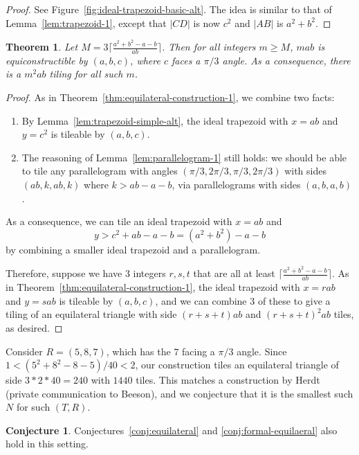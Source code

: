 \documentclass{amsart}
\theoremstyle{plain}
\newtheorem{thm}{Theorem}
\theoremstyle{definition}
\newtheorem{conj}{Conjecture}
\begin{document}
\begin{proof}
    See Figure~\ref{fig:ideal-trapezoid-basic-alt}. The idea is similar to that of Lemma~\ref{lem:trapezoid-1}, except that $|CD|$ is now $c^2$ and $|AB|$ is $a^2 + b^2$.
\end{proof}

\begin{thm}
    \label{thm:equilateral-construction-2} Let $M = 3\lceil \frac{a^2+b^2 - a - b}{ab} \rceil$. Then for all integers $m \geq M$, $mab$ is equiconstructible by $(a,b,c)$, where $c$ faces a $\pi/3$ angle. As a consequence, there is a $m^2 ab$ tiling for all such $m$.
\end{thm}
\begin{proof}
As in  Theorem~\ref{thm:equilateral-construction-1}, we combine two facts:
\begin{enumerate}
    \item By Lemma~\ref{lem:trapezoid-simple-alt}, the ideal trapezoid with $x=ab$ and $y=c^2$ is tileable by $(a,b,c).$ 
    \item The reasoning of Lemma~\ref{lem:parallelogram-1} still holds: we should be able to tile any parallelogram with angles $(\pi/3, 2\pi/3, \pi/3, 2\pi/3)$ with sides $(ab,k,ab,k)$ where $k > ab-a-b$, via parallelograms with sides $(a,b,a,b)$.
\end{enumerate} 
As a consequence, we can  tile an ideal trapezoid with $x=ab$ and 
$$y > c^2 + ab-a-b = (a^2 + b^2) - a - b$$
by combining a smaller ideal trapezoid and a parallelogram.

Therefore, suppose we have $3$ integers $r, s, t$ that are all at least $\lceil \frac{a^2+b^2 - a - b}{ab} \rceil$. As in Theorem~\ref{thm:equilateral-construction-1}, the ideal trapezoid with $x=rab$ and $y=sab$ is tileable by $(a,b,c)$, and we can combine $3$ of these to give a tiling of an equilateral triangle with side $(r+s+t)ab$ and $(r+s+t)^2ab$ tiles, as desired.
\end{proof}

Consider $R = (5,8,7)$, which has the $7$ facing a $\pi/3$ angle. Since $1< (5^2 + 8^2 - 8 - 5)/40 < 2$, our construction tiles an equilateral triangle of side $3*2*40 = 240$ with $1440$ tiles. This matches a construction by Herdt (private communication to Beeson), and we conjecture that it is the smallest such $N$ for such $(T,R)$.

\begin{conj}
Conjectures~\ref{conj:equilateral} and \ref{conj:formal-equilaeral} also hold in this setting.
\end{conj}
\end{document}

